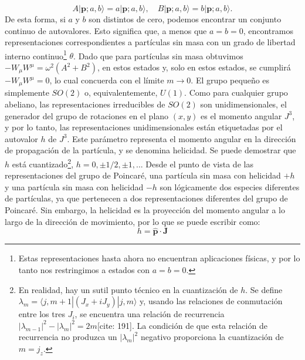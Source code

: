 \documentclass[a4paper,11pt]{book} %
\begin{document}
\begin{equation}
A|\mathbf{p};a,b\rangle=a|\mathbf{p};a,b\rangle, \quad B|\mathbf{p};a,b\rangle=b|\mathbf{p};a,b\rangle.
\end{equation}
De esta forma, si $a$ y $b$ son distintos de cero, podemos encontrar un conjunto continuo de autovalores. Esto significa que, a menos que $a=b=0$, encontramos representaciones correspondientes a partículas sin masa con un grado de libertad interno continuo\footnote{Estas representaciones hasta ahora no encuentran aplicaciones físicas, y por lo tanto nos restringimos a estados con $a=b=0$.} $\theta$. 
\medskip\newline
Dado que para partículas sin masa obtuvimos $-W_{\mu}W^{\mu}=\omega^{2}(A^{2}+B^{2})$, en estos estados y, solo en estos estados, se cumplirá $-W_{\mu}W^{\mu}=0$, lo cual concuerda con el límite $m\rightarrow0$. El grupo pequeño es simplemente $SO(2)$ o, equivalentemente, $U(1)$.
\medskip\newline
Como para cualquier grupo abeliano, las representaciones irreducibles de $SO(2)$ son unidimensionales, el generador del grupo de rotaciones en el plano $(x,y)$ es el momento angular $J^{3}$, y por lo tanto, las representaciones unidimensionales están etiquetadas por el autovalor $h$ de $J^{3}$. Este parámetro representa el momento angular en la dirección de propagación de la partícula, y se denomina helicidad.
\medskip\newline
Se puede demostrar que $h$ está cuantizado\footnote{En realidad, hay un sutil punto técnico en la cuantización de $h$. Se define $\lambda_{m}=\langle j,m+1|(J_{x}+iJ_{y})|j,m\rangle$ y, usando las relaciones de conmutación entre los tres $J_{i}$, se encuentra una relación de recurrencia $|\lambda_{m-1}|^{2}-|\lambda_{m}|^{2}=2m$[cite: 191]. La condición de que esta relación de recurrencia no produzca un $|\lambda_{m}|^{2}$ negativo proporciona la cuantización de $m=j_{z}$.}, $h=0,\pm1/2,\pm1,...$
\medskip\newline
Desde el punto de vista de las representaciones del grupo de Poincaré, una partícula sin masa con helicidad $+h$ y una partícula sin masa con helicidad $-h$ son lógicamente dos especies diferentes de partículas, ya que pertenecen a dos representaciones diferentes del grupo de Poincaré. Sin embargo, la helicidad es la proyección del momento angular a lo largo de la dirección de movimiento, por lo que se puede escribir como:
\begin{equation}
h=\hat{\mathbf{p}}\cdot \mathbf{J}
\end{equation} %
\end{document}

